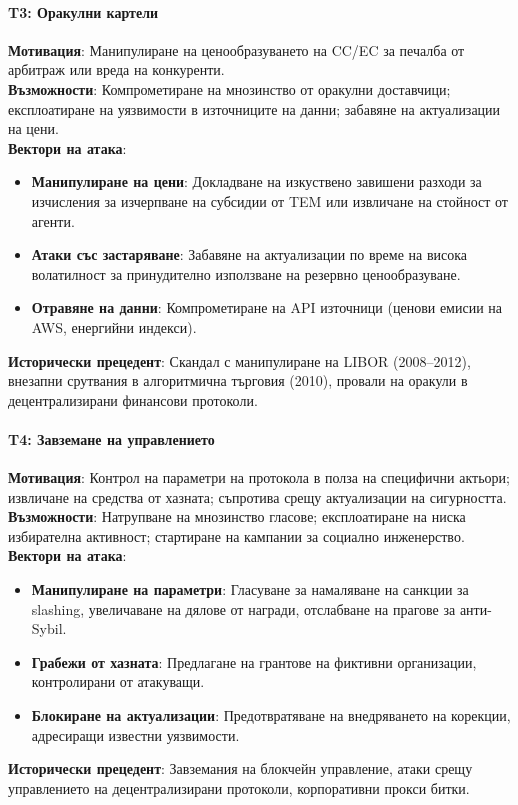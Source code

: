 \documentclass[11pt]{article}
\begin{document}
\paragraph{T3: Оракулни картели}
\textbf{Мотивация}: Манипулиране на ценообразуването на CC/EC за печалба от арбитраж или вреда на конкуренти.\\
\textbf{Възможности}: Компрометиране на мнозинство от оракулни доставчици; експлоатиране на уязвимости в източниците на данни; забавяне на актуализации на цени.\\
\textbf{Вектори на атака}:
\begin{itemize}[noitemsep]
  \item \textbf{Манипулиране на цени}: Докладване на изкуствено завишени разходи за изчисления за изчерпване на субсидии от TEM или извличане на стойност от агенти.
  \item \textbf{Атаки със застаряване}: Забавяне на актуализации по време на висока волатилност за принудително използване на резервно ценообразуване.
  \item \textbf{Отравяне на данни}: Компрометиране на API източници (ценови емисии на AWS, енергийни индекси).
\end{itemize}
\textbf{Исторически прецедент}: Скандал с манипулиране на LIBOR (2008--2012), внезапни срутвания в алгоритмична търговия (2010), провали на оракули в децентрализирани финансови протоколи.

\paragraph{T4: Завземане на управлението}
\textbf{Мотивация}: Контрол на параметри на протокола в полза на специфични актьори; извличане на средства от хазната; съпротива срещу актуализации на сигурността.\\
\textbf{Възможности}: Натрупване на мнозинство гласове; експлоатиране на ниска избирателна активност; стартиране на кампании за социално инженерство.\\
\textbf{Вектори на атака}:
\begin{itemize}[noitemsep]
  \item \textbf{Манипулиране на параметри}: Гласуване за намаляване на санкции за slashing, увеличаване на дялове от награди, отслабване на прагове за анти-Sybil.
  \item \textbf{Грабежи от хазната}: Предлагане на грантове на фиктивни организации, контролирани от атакуващи.
  \item \textbf{Блокиране на актуализации}: Предотвратяване на внедряването на корекции, адресиращи известни уязвимости.
\end{itemize}
\textbf{Исторически прецедент}: Завземания на блокчейн управление, атаки срещу управлението на децентрализирани протоколи, корпоративни прокси битки.
\end{document}
